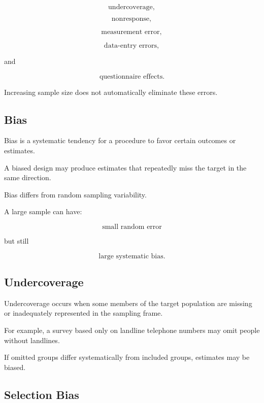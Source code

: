\[
\boxed{
\text{undercoverage},
}
\]

\[
\boxed{
\text{nonresponse},
}
\]

\[
\boxed{
\text{measurement error},
}
\]

\[
\boxed{
\text{data-entry errors},
}
\]

and

\[
\boxed{
\text{questionnaire effects}.
}
\]

Increasing sample size does not automatically eliminate these errors.

\subsection{Bias}
\label{subsec:bias-data-collection}

Bias is a systematic tendency for a procedure to favor certain outcomes
or estimates.

A biased design may produce estimates that repeatedly miss the target in
the same direction.

Bias differs from random sampling variability.

A large sample can have:

\[
\boxed{
\text{small random error}
}
\]

but still

\[
\boxed{
\text{large systematic bias}.
}
\]

\subsection{Undercoverage}
\label{subsec:undercoverage}

Undercoverage occurs when some members of the target population are
missing or inadequately represented in the sampling frame.

For example, a survey based only on landline telephone numbers may omit
people without landlines.

If omitted groups differ systematically from included groups, estimates
may be biased.

\subsection{Selection Bias}
\label{subsec:selection-bias}


